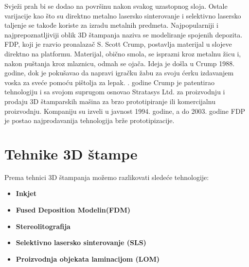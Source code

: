 \documentclass[a4paper]{article}
\begin{document}
{\bigbreak Svježi prah bi se dodao na površinu nakon svakog uzastopnog sloja. Ostale varijacije kao što su direktno metalno lasersko sinterovanje i selektivno lasersko taljenje se takođe koriste za izradu metalnih predmeta. 
\bigbreak Najpopularniji i najprepoznatljiviji oblik 3D štampanja naziva se modeliranje spojenih depozita. FDP, koji je razvio pronalazač S. Scott Crump, postavlja materijal u slojeve direktno na platformu. Materijal, obično smola, se isprazni kroz metalnu žicu i, nakon puštanja kroz mlaznicu, odmah se ojača. Ideja je došla u Crump 1988. godine, dok je pokušavao da napravi igračku žabu za svoju ćerku izdavanjem voska za sveće pomoću pištolja za lepak. 
. godine Crump je patentirao tehnologiju i sa svojom suprugom osnovao Stratasys Ltd. za proizvodnju i prodaju 3D štamparskih mašina za brzo prototipiranje ili komercijalnu proizvodnju. 
Kompaniju su izveli u javnost 1994. godine, a do 2003. godine FDP je postao najprodavanija tehnologija brže prototipizacije. 

\section{Tehnike 3D štampe}
\label{sec:naslov1}
Prema tehnici 3D štampanja možemo razlikovati sledeće tehnologije:
\begin{itemize}
\item \textbf{Inkjet}
\item \textbf{Fused Deposition Modelin(FDM)}
\item \textbf{Stereolitografija}
\item \textbf{Selektivno lasersko sinterovanje (SLS)}
\item \textbf{Proizvodnja objekata laminacijom (LOM)}
\end{itemize} 



 


}
\end{document}
